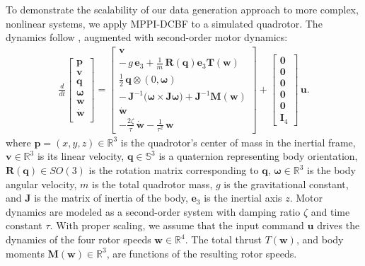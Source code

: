 \documentclass[letterpaper, 10 pt, conference]{ieeeconf}
\begin{document}
To demonstrate the scalability of our data generation approach to more complex, nonlinear systems, we apply MPPI-DCBF to a simulated quadrotor. The dynamics follow \cite{lee2010geometric}, augmented with second-order motor dynamics:
\begin{align}
\frac{d}{dt}\begin{bmatrix}
    \mathbf{p}\\\mathbf{v}\\ \mathbf{q}\\ \boldsymbol{\omega}\\ \mathbf{w}\\ \dot{\mathbf{w}}\\
\end{bmatrix}=
\begin{bmatrix}
\mathbf{v} \\[0.5mm]
-\,g\,\mathbf{e}_3 +\frac{1}{m}\,\mathbf R(\mathbf{q})\mathbf{e}_3 \mathbf T(\mathbf{w})\\[0.5mm]
\tfrac{1}{2}\,\mathbf{q}\otimes(0,\boldsymbol{\omega}) \\[0.5mm]
-\,\mathbf{J}^{-1}\!\big(\boldsymbol{\omega}\times\mathbf{J}\boldsymbol{\omega}\big)+\mathbf{J}^{-1}\mathbf{M(\mathbf{w})} \\[0.5mm]
\dot{\mathbf{w}} \\[0.5mm]
-\tfrac{2\zeta}{\tau}\,\dot{\mathbf{w}} - \tfrac{1}{\tau^{2}}\,\mathbf{w}
\end{bmatrix}
+
\begin{bmatrix}
\mathbf{0} \\ \mathbf{0} \\ \mathbf{0} \\ \mathbf{0} \\ \mathbf{0} \\ \mathbf{I}_4
\end{bmatrix}\,\mathbf{u}.
\label{eq:quad_affine}
\end{align}
\noindent where $\mathbf{p}=(x,y,z)\in \mathbb{R}^3$ is the quadrotor's center of mass in the inertial frame, $\mathbf{v}\in\mathbb{R}^3$ is its linear velocity, $\mathbf{q}\in\mathbb{S}^3$ is a quaternion representing body orientation, $\mathbf R(\mathbf{q})\in SO(3)$ is the rotation matrix corresponding to $\mathbf{q}$, $\boldsymbol{\omega}\in\mathbb{R}^3$ is the body angular velocity, $m$ is the total quadrotor mass, $g$ is the gravitational constant, and $\mathbf{J}$ is the matrix of inertia of the body, $\mathbf{e}_3$ is the inertial axis $z$. Motor dynamics are modeled as a second-order system with damping ratio $\zeta$ and time constant $\tau$. With proper scaling, we assume that the input command $\mathbf{u}$ drives the dynamics of the four rotor speeds $\mathbf{w}\in\mathbb{R}^4$. The total thrust $T(\mathbf{w})$, and body moments $\mathbf{M}(\mathbf{w})\in\mathbb{R}^3$, are functions of the resulting rotor speeds.
\end{document}
